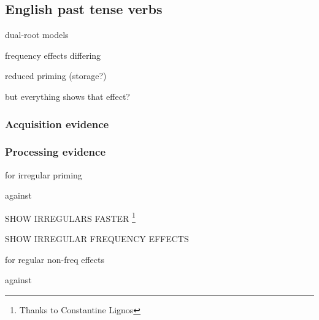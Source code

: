 \subsection{English past tense verbs}

dual-root models \citet{Baayen1997b}

frequency effects differing

reduced priming (storage?)
\citet{Stanners1979}
\citet{Marslen-Wilson1993}

\citet{ODonnell2011a}
\citet{ODonnell2011b}

but everything shows that effect?

\citet{Alegre1999}
\citet{Gordon1999}

\subsubsection{Acquisition evidence}

\citet{GormanInPressa}

\citet{Prasada1993}
\citet{Albright2003b}

\subsubsection{Processing evidence}

for irregular priming
\citet{Emmorey1989}
\citet{Allen2002}
\citet{Stockall2006}

against
\citet{Stanners1979}
\citet{Marslen-Wilson1993}

\citet{ELP}

SHOW IRREGULARS FASTER
\footnote{Thanks to Constantine Lignos}

SHOW IRREGULAR FREQUENCY EFFECTS

for regular non-freq effects
\citet{LignosSubmitted}

against
\citet{Alegre1999}
\citet{Gordon1999}
\citet{Baayen2008}
